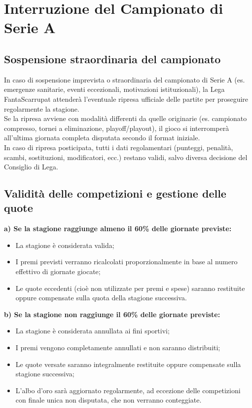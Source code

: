 \chapter{Interruzione del Campionato di Serie A}
\label{cap:interruzione-campionato}

\section{Sospensione straordinaria del campionato}
\label{art:7.1}

In caso di sospensione imprevista o straordinaria del campionato di Serie A (es. emergenze sanitarie, eventi eccezionali, motivazioni istituzionali), la Lega FantaScarrupat attenderà l’eventuale ripresa ufficiale delle partite per proseguire regolarmente la stagione.\\

Se la ripresa avviene con modalità differenti da quelle originarie (es. campionato compresso, tornei a eliminazione, playoff/playout), il gioco si interromperà all’ultima giornata completa disputata secondo il format iniziale.\\

In caso di ripresa posticipata, tutti i dati regolamentari (punteggi, penalità, scambi, sostituzioni, modificatori, ecc.) restano validi, salvo diversa decisione del Consiglio di Lega.

\section{Validità delle competizioni e gestione delle quote}
\label{art:7.2}

\noindent
\textbf{a) Se la stagione raggiunge almeno il 60\% delle giornate previste:}
\begin{itemize}
  \item La stagione è considerata valida;
  \item I premi previsti verranno ricalcolati proporzionalmente in base al numero effettivo di giornate giocate;
  \item Le quote eccedenti (cioè non utilizzate per premi e spese) saranno restituite oppure compensate sulla quota della stagione successiva.
\end{itemize}

\noindent
\textbf{b) Se la stagione non raggiunge il 60\% delle giornate previste:}
\begin{itemize}
  \item La stagione è considerata annullata ai fini sportivi;
  \item I premi vengono completamente annullati e non saranno distribuiti;
  \item Le quote versate saranno integralmente restituite oppure compensate sulla stagione successiva;
  \item L’albo d’oro sarà aggiornato regolarmente, ad eccezione delle competizioni con finale unica non disputata, che non verranno conteggiate.
\end{itemize}

